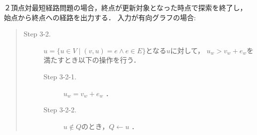 \documentclass[12pt]{optlab-bachelor}
\begin{document}
２頂点対最短経路問題の場合，終点が更新対象となった時点で探索を終了し，
始点から終点への経路を出力する．
入力が有向グラフの場合:
\begin{quote}
\begin{description}
\item[Step 3-2.] $u = \{ u \in V \mid (v,u) = e \land e \in E \}$となる$u$に対して，
$u_w > v_w + e_w$を満たすとき以下の操作を行う．
\begin{description}
  \item[Step 3-2-1.] $u_w = v_w + e_w$ ．
  \item[Step 3-2-2.] $u \notin Q$のとき，$Q \leftarrow u$ ．
\end{description}
\end{description}
\end{quote}
\end{document}
